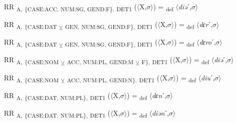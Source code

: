 {\begin{exe}
 RR \textsubscript{A,} \textsubscript{\{CASE:ACC, NUM:SG, GEND:F\},} \textsubscript{DET1} ($\langle$X,$\sigma $$\rangle$) = \textsubscript{def} $\langle$\textit{diə}ˊ,$\sigma $$\rangle$
\end{exe}

\begin{exe}
 RR \textsubscript{A,} \textsubscript{\{CASE:DAT} \textsubscript{${\veebar}$}\textsubscript{ GEN, NUM:SG, GEND:F\},} \textsubscript{DET1} ($\langle$X,$\sigma $$\rangle$) = \textsubscript{def} $\langle$\textit{dɛr}ˊ,$\sigma $$\rangle$
\end{exe}

\begin{exe}
 RR \textsubscript{A,} \textsubscript{\{CASE:DAT} \textsubscript{${\veebar}$}\textsubscript{ GEN, NUM:SG, GEND:F\},} \textsubscript{DET1} ($\langle$X,$\sigma $$\rangle$) = \textsubscript{def} $\langle$\textit{dɛro}ˊ,$\sigma $$\rangle$
\end{exe}

\begin{exe}
 RR \textsubscript{A,} \textsubscript{\{CASE:NOM} \textsubscript{${\veebar}$}\textsubscript{ ACC, NUM:PL, GEND:M} \textsubscript{${\veebar}$}\textsubscript{ F\},} \textsubscript{DET1} ($\langle$X,$\sigma $$\rangle$) = \textsubscript{def} $\langle$\textit{diə}ˊ,$\sigma $$\rangle$
\end{exe}

\begin{exe}
 RR \textsubscript{A,} \textsubscript{\{CASE:NOM} \textsubscript{${\veebar}$}\textsubscript{ ACC, NUM:PL, GEND:N\},} \textsubscript{DET1} ($\langle$X,$\sigma $$\rangle$) = \textsubscript{def} $\langle$\textit{diu}ˊ,$\sigma $$\rangle$
\end{exe}

\begin{exe}
 RR \textsubscript{A,} \textsubscript{\{CASE:DAT, NUM:PL\},} \textsubscript{DET1} ($\langle$X,$\sigma $$\rangle$) = \textsubscript{def} $\langle$\textit{dɛn}ˊ,$\sigma $$\rangle$
\end{exe}

\begin{exe}
 RR \textsubscript{A,} \textsubscript{\{CASE:DAT, NUM:PL\},} \textsubscript{DET1} ($\langle$X,$\sigma $$\rangle$) = \textsubscript{def} $\langle$\textit{diən}ˊ,$\sigma $$\rangle$
\end{exe}

}
